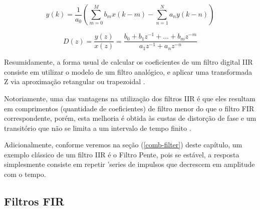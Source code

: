 		\begin{equation}
			y(k) = \frac{1}{a_0}\left(\sum_{m=0}^{M}b_mx(k-m)-\sum_{n=1}^{N} a_ny(k-n)\right)
			\label{eq1-iir}
		\end{equation}
		
		\begin{equation}
			D(z) = \frac{y(z)}{x(z)} = \frac{b_0 + b_1z^{-1}+...+ b_mz^{-m}}{a_1z^{-1}+ a_nz^{-n}}
			\label{eq2-iir-tf}
		\end{equation}
		
		Resumidamente, a forma usual de calcular os coeficientes de um filtro digital IIR consiste em utilizar o modelo de um filtro analógico, e aplicar uma transformada Z via aproximação retangular ou trapezoidal \cite{Oppenhein1998}.
		
		Notoriamente, uma das vantagens na utilização dos filtros IIR é que eles resultam em comprimentos (quantidade de coeficientes) de filtro menor do que o filtro FIR correspondente, porém, esta melhoria é obtida às custas de distorção de fase e um transitório que não se limita a um intervalo de tempo finito \cite{Roberts1987}.
		
		Adicionalmente, conforme veremos na seção (\ref{comb-filter}) deste capítulo, um exemplo clássico de um filtro IIR é o Filtro Pente, pois se estável, a resposta simplesmente consiste em repetir 'series de impulsos que decrescem em amplitude com o tempo.
		
		
	\subsection{Filtros FIR}
		
